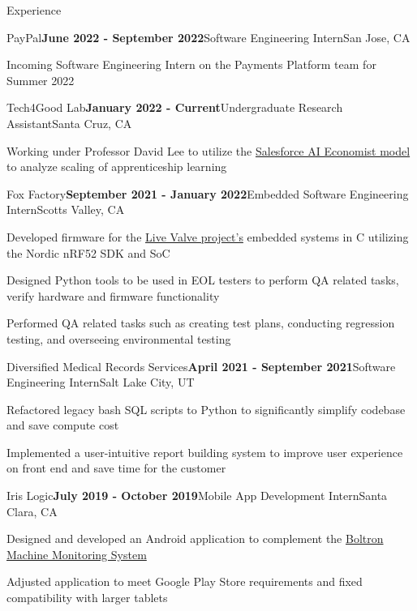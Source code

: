 \documentclass{resume}
\begin{document}
\begin{rSection}{\large Experience}

\begin{rSubsection}{PayPal}{\bf{June 2022 - September 2022}}{Software Engineering Intern}{San Jose, CA }
\item Incoming Software Engineering Intern on the Payments Platform team for Summer 2022 
\end{rSubsection}

\begin{rSubsection}{Tech4Good Lab}{\bf{January 2022 - Current}}{Undergraduate Research Assistant}{Santa Cruz, CA }
\item Working under Professor David Lee to utilize the \href{https://github.com/salesforce/ai-economist}{Salesforce AI Economist model} to analyze scaling of apprenticeship learning
\end{rSubsection}

\begin{rSubsection}{Fox Factory}{\bf{September 2021 - January 2022}}{Embedded Software Engineering Intern}{Scotts Valley, CA }
\item Developed firmware for the \href{https://www.pinkbike.com/news/fox-updates-live-valve-electonic-suspension-for-2022.html}{Live Valve project's} embedded systems in C utilizing the Nordic nRF52 SDK and SoC
\item Designed Python tools to be used in EOL testers to perform QA related tasks, verify hardware and firmware functionality
\item Performed QA related tasks such as creating test plans, conducting regression testing, and overseeing environmental testing
\end{rSubsection}

\begin{rSubsection}{Diversified Medical Records Services}{\bf{April 2021 - September 2021}}{Software Engineering Intern}{Salt Lake City, UT }
\item Refactored legacy bash SQL scripts to Python to significantly simplify codebase and save compute cost
\item Implemented a user-intuitive report building system to improve user experience on front end and save time for the customer
\end{rSubsection}

\begin{rSubsection}{Iris Logic}{\bf{July 2019 - October 2019}}{Mobile App Development Intern}{Santa Clara, CA }
\item Designed and developed an Android application to complement the \href{https://irislogic.com/boltron-machine-monitoring-system/}{Boltron Machine Monitoring System}
\item Adjusted application to meet Google Play Store requirements and fixed compatibility with larger tablets
\end{rSubsection}

\end{rSection}
\end{document}
